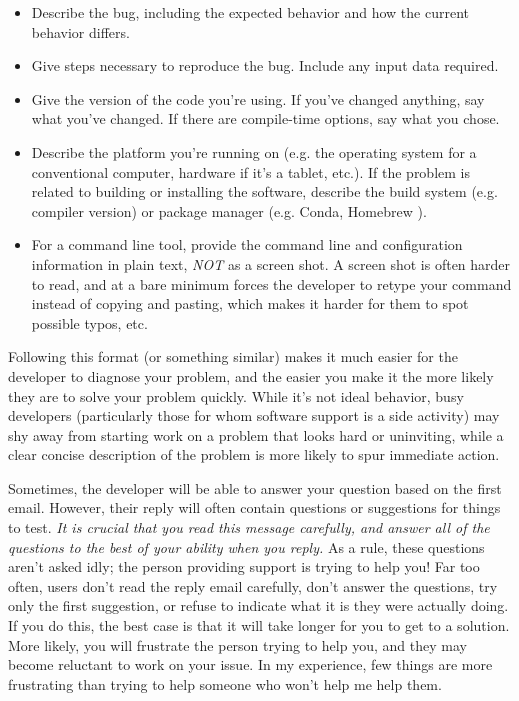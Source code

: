 \documentclass[9pt,training,pubversion]{livecoms}
\begin{document}
\begin{itemize}

    \item Describe the bug, including the expected behavior and how the current
    behavior differs.

    \item Give steps necessary to reproduce the bug. Include any input data
    required.

    \item Give the version of the code you're using. If you've changed anything,
    say what you've changed. If there are compile-time options, say what you
    chose.

    \item Describe the platform you're running on (e.g. the operating system for
    a conventional computer, hardware if it's a tablet, etc.). If the problem is
    related to building or installing the software, describe the build system
    (e.g. compiler version) or package manager (e.g. Conda\cite{CONDA}, Homebrew \cite{HOMEBREW}).

    \item For a command line tool, provide the command line and configuration
    information in plain text, \emph{NOT} as a screen shot. A screen shot is
    often harder to read, and at a bare minimum forces the developer to retype
    your command instead of copying and pasting, which makes it harder for them
    to spot possible typos, etc.

\end{itemize}

Following this format (or something similar) makes it much easier for the
developer to diagnose your problem, and the easier you make it the more likely
they are to solve your problem quickly. While it's not ideal behavior, busy
developers (particularly those for whom software support is a side activity) may
shy away from starting work on a problem that looks hard or uninviting, while a
clear concise description of the problem is more likely to spur immediate
action.

Sometimes, the developer will be able to answer your question based on the first
email. However, their reply will often contain questions or suggestions for
things to test. \emph{It is crucial that you read this message carefully, and
answer all of the questions to the best of your ability when you reply.} As a
rule, these questions aren't asked idly; the person providing support is trying
to help you! Far too often, users don't read the reply email carefully, don't
answer the questions, try only the first suggestion, or refuse to indicate what
it is they were actually doing. If you do this, the best case is that it will
take longer for you to get to a solution. More likely, you will frustrate the
person trying to help you, and they may become reluctant to work on your issue.
In my experience, few things are more frustrating than trying to help someone
who won't help me help them.
\end{document}
